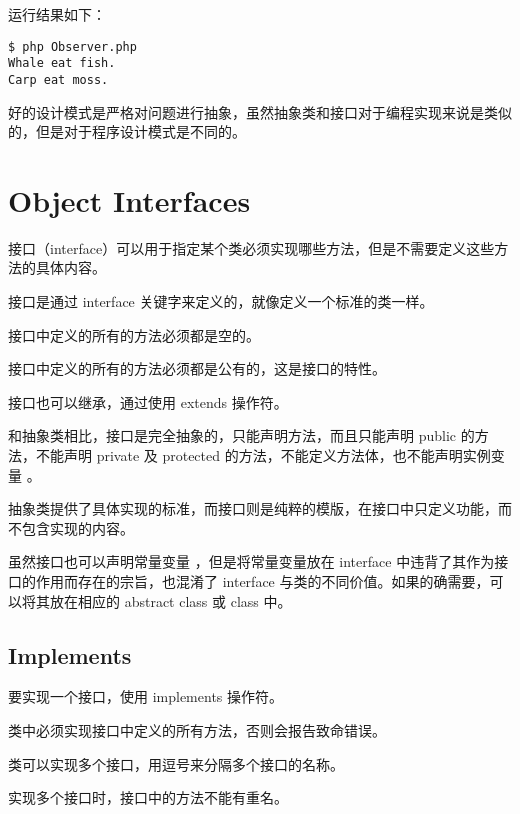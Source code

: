 运行结果如下：

\begin{verbatim}
$ php Observer.php
Whale eat fish.
Carp eat moss.
\end{verbatim}

好的设计模式是严格对问题进行抽象，虽然抽象类和接口对于编程实现来说是类似的，但是对于程序设计模式是不同的。


\chapter{Object Interfaces}


接口（interface）可以用于指定某个类必须实现哪些方法，但是不需要定义这些方法的具体内容。

接口是通过 interface 关键字来定义的，就像定义一个标准的类一样。

\begin{compactitem}
\item 接口中定义的所有的方法必须都是空的。
\item 接口中定义的所有的方法必须都是公有的，这是接口的特性。
\item 接口也可以继承，通过使用 extends 操作符。
\end{compactitem}

和抽象类相比，接口是完全抽象的，只能声明方法，而且只能声明 public 的方法，不能声明 private 及 protected 的方法，不能定义方法体，也不能声明实例变量 。

抽象类提供了具体实现的标准，而接口则是纯粹的模版，在接口中只定义功能，而不包含实现的内容。

虽然接口也可以声明常量变量 ，但是将常量变量放在 interface 中违背了其作为接口的作用而存在的宗旨，也混淆了 interface 与类的不同价值。如果的确需要，可以将其放在相应的 abstract class 或 class 中。


\section{Implements}


要实现一个接口，使用 implements 操作符。

\begin{compactitem}
\item 类中必须实现接口中定义的所有方法，否则会报告致命错误。
\item 类可以实现多个接口，用逗号来分隔多个接口的名称。
\item 实现多个接口时，接口中的方法不能有重名。
\end{compactitem}


